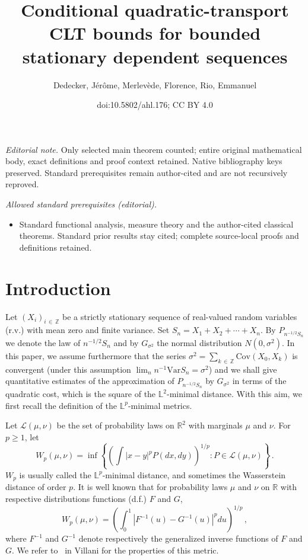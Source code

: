 \documentclass[10pt]{amsart}
\title{Conditional quadratic-transport CLT bounds for bounded stationary dependent sequences}
\author{Dedecker, Jérôme, Merlevède, Florence, Rio, Emmanuel}
\date{doi:10.5802/ahl.176; CC BY 4.0}
\theoremstyle{definition}\newtheorem{defi}[theo]{Definition}\newtheorem{rema}[theo]{Remark}\newtheorem{exam}[theo]{Example}\newtheorem{exem}[theo]{Example}\newtheorem{nota}[theo]{Notation}
\newcommand{\bbZ}{\mathbb{Z}}
\newcommand{\clL}{\mathcal{L}}
\newcommand{\bbR}{\mathbb{R}}
\newcommand{\bbL}{\mathbb{L}}
\newcommand{\Cov}{\mathrm{Cov}}
\newcommand{\Var}{\mathrm{Var}}
\begin{document}
\maketitle
\noindent\textit{Editorial note.} Only selected main theorem counted; entire original mathematical body, exact definitions and proof context retained. Native bibliography keys preserved. Standard prerequisites remain author-cited and are not recursively reproved.\par\medskip
\noindent\textit{Allowed standard prerequisites (editorial).}\begin{itemize}
\item Standard functional analysis, measure theory and the author-cited classical theorems. Standard prior results stay cited; complete source-local proofs and definitions retained.
\end{itemize}\medskip

\section{Introduction}

Let $(X_i)_{i\,\in\,\bbZ}$ be a strictly stationary sequence of real-valued random variables (r.v.) with mean zero and finite variance. Set $S_n = X_1 + X_2 + \cdots + X_n$. By $P_{n^{-1/2}S_n}$ we denote the law of $n^{-1/2}S_{n}$ and by $G_{\sigma^2}$ the normal distribution $ N(0, \sigma^2)$. In this paper, we assume furthermore that the series $\sigma^2=\sum_{k\,\in\,\bbZ} \Cov (X_0,X_k)$ is convergent (under this assumption $\lim_n n^{-1} \Var S_n = \sigma^2$) and we shall give quantitative estimates of the approximation of $P_{n^{-1/2}S_n}$ by $G_{\sigma^2}$ in terms of the quadratic cost, which is the square of the $\bbL^2$-minimal distance. With this aim, we first recall the definition of the $\bbL^p$-minimal metrics.

Let $\clL(\mu, \nu)$ be the set of probability laws on $\bbR^2$ with marginals $\mu$ and $\nu$. For $p\geq 1$, let
\[
W_p(\mu, \nu) =  \inf \left\{ \left (\int |x-y|^p P(dx, dy) \right)^{1/p} : P \in \clL(\mu, \nu) \right \} \,.
\]
$W_p$ is usually called the $\bbL^p$-minimal distance, and sometimes the Wasserstein distance of order $p$. It is well known that for probability laws $\mu$ and $\nu$ on $\bbR$ with respective distributions functions (d.f.) $F$ and $G$,
\begin{equation}\label{def2wasser}
W_p(\mu, \nu) = \left(\int_0^1 |F^{-1}(u) - G^{-1}(u) |^p du\right)^{1/p} \,,
\end{equation}
where $F^{-1}$ and $G^{-1}$ denote respectively the generalized inverse functions of $F$ and $G$. We refer to~\cite[Chapter~6]{Vi2009} in Villani for the properties of this metric.
\end{document}
